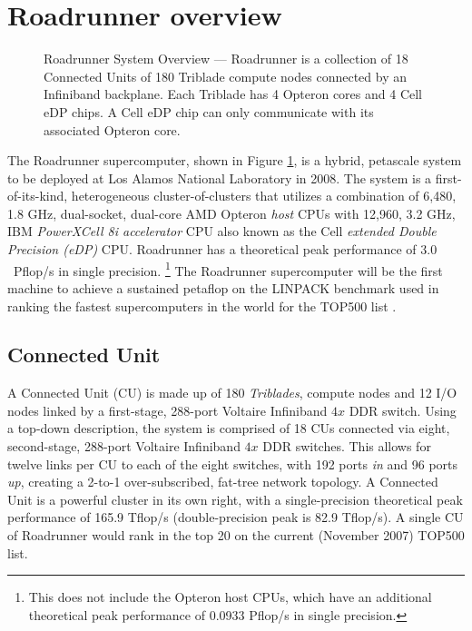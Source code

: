 \documentclass[letter,10pt]{article}
\begin{document}
\section{Roadrunner overview}

\begin{figure}
    \begin{center}
    \scalebox{0.3}{}
    \caption{Roadrunner System Overview ---
Roadrunner is a collection of 18 Connected Units of
180 Triblade compute nodes connected by an Infiniband backplane.
Each Triblade has 4 Opteron cores and 4 Cell eDP chips.
A Cell eDP chip can only communicate with its associated Opteron core.}
    \label{fig:system}
    \end{center}
\end{figure}

The Roadrunner supercomputer, shown in Figure \ref{fig:system}, is a
hybrid, petascale system to be deployed at Los Alamos National
Laboratory in 2008.  The system is a first-of-its-kind, heterogeneous
cluster-of-clusters that utilizes a combination of 6,480, 1.8 GHz,
dual-socket, dual-core AMD Opteron \emph{host} CPUs with 12,960, 3.2
GHz, IBM \emph{PowerXCell 8i accelerator} CPU also known as the Cell
\emph{extended Double Precision (eDP)} CPU.  Roadrunner has a
theoretical peak performance of $3.0$~Pflop/s in single precision.
\footnote{This does not include the Opteron host CPUs, which have
an additional theoretical peak performance of 0.0933 Pflop/s in
single precision.}  The Roadrunner supercomputer will be the first machine 
to achieve a sustained petaflop on the LINPACK benchmark used in ranking
the fastest supercomputers in the world for the TOP500 list
\cite{top500}.

\subsection{Connected Unit}

A Connected Unit (CU) is made up of 180 \emph{Triblades}, compute
nodes and 12 I/O nodes linked by a first-stage, 288-port Voltaire
Infiniband $4x$ DDR switch.  Using a top-down description, the
system is comprised of 18 CUs connected via eight, second-stage,
288-port Voltaire Infiniband $4x$ DDR switches.  This allows for
twelve links per CU to each of the eight switches, with 192 ports
\emph{in} and 96 ports \emph{up}, creating a 2-to-1 over-subscribed,
fat-tree network topology.  A Connected Unit is a powerful cluster in
its own right, with a single-precision theoretical peak performance
of 165.9 Tflop/s (double-precision peak is 82.9 Tflop/s).
A single CU of Roadrunner would rank in the top 20 on the
current (November 2007) TOP500 list.
\end{document}
